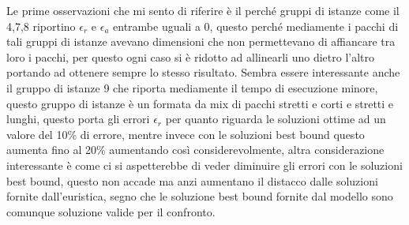 Le prime osservazioni che mi sento di riferire è il perché gruppi di istanze come il 4,7,8 riportino $\epsilon_r$ e $\epsilon_a$ entrambe uguali a 0, questo perché mediamente i pacchi di tali gruppi di istanze avevano dimensioni che non permettevano di affiancare tra loro i pacchi, per questo ogni caso si è ridotto ad allinearli uno dietro l'altro portando ad ottenere sempre lo stesso risultato. Sembra essere interessante anche il gruppo di istanze 9 che riporta mediamente il tempo di esecuzione minore, questo gruppo di istanze è un formata da mix di pacchi stretti e corti e stretti e lunghi, questo porta gli errori $\epsilon_r$ per quanto riguarda le soluzioni ottime ad un valore del 10\% di errore, mentre invece con le soluzioni best bound questo aumenta fino al 20\% aumentando così considerevolmente, altra considerazione interessante è come ci si aspetterebbe di veder diminuire gli errori con le soluzioni best bound, questo non accade ma anzi aumentano il distacco dalle soluzioni fornite dall'euristica, segno che le soluzione best bound fornite dal modello sono comunque soluzione valide per il confronto.

\newpage
